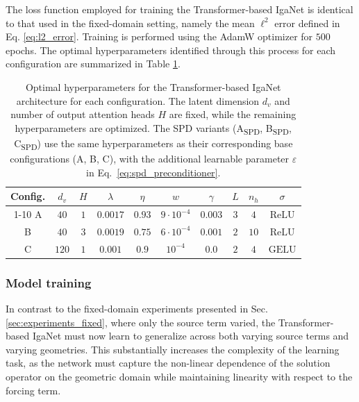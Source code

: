 \documentclass{article}
\newcommand{\Dlat}{d_v} %
\theoremstyle{plain}
\numberwithin{equation}{section}
\begin{document}
The loss function employed for training the Transformer-based IgaNet is identical to that used in the fixed-domain setting, namely the mean $\ell^2$ error defined in Eq. \eqref{eq:l2_error}. Training is performed using the AdamW optimizer for $500$ epochs. The optimal hyperparameters identified through this process for each configuration are summarized in Table \ref{table:transformer_hyperparams}.

\begin{table}[!ht]
    \centering
    \begin{tabular}{cccccccccc}
        \toprule
        Config. & $\Dlat$ & $H$ & $\lambda$ & $\eta$ & $w$              & $\gamma$ & $L$ & $n_h$ & $\sigma$      \\
        \cmidrule{1-10}
        A             & $40$    & $1$ & $0.0017$  & $0.93$ & $9\cdot 10^{-4}$ & $0.003$  & $3$ & $4$   & $\text{ReLU}$ \\
        B             & $40$    & $3$ & $0.0019$  & $0.75$ & $6\cdot 10^{-4}$ & $0.001$  & $2$ & $10$  & $\text{ReLU}$ \\
        C             & $120$   & $1$ & $0.001$   & $0.9$  & $10^{-4}$        & $0.0$    & $2$ & $4$   & $\text{GELU}$ \\
        \bottomrule
    \end{tabular}
    \caption{Optimal hyperparameters for the Transformer-based IgaNet architecture for each configuration. The latent dimension $\Dlat$ and number of output attention heads $H$ are fixed, while the remaining hyperparameters are optimized. The SPD variants (A\textsubscript{SPD}, B\textsubscript{SPD}, C\textsubscript{SPD}) use the same hyperparameters as their corresponding base configurations (A, B, C), with the additional learnable parameter $\varepsilon$ in Eq.~\eqref{eq:spd_preconditioner}.}
    \label{table:transformer_hyperparams}
\end{table}

\subsubsection{Model training}
In contrast to the fixed-domain experiments presented in Sec. \ref{sec:experiments_fixed}, where only the source term varied, the Transformer-based IgaNet must now learn to generalize across both varying source terms and varying geometries. This substantially increases the complexity of the learning task, as the network must capture the non-linear dependence of the solution operator on the geometric domain while maintaining linearity with respect to the forcing term.
\end{document}
